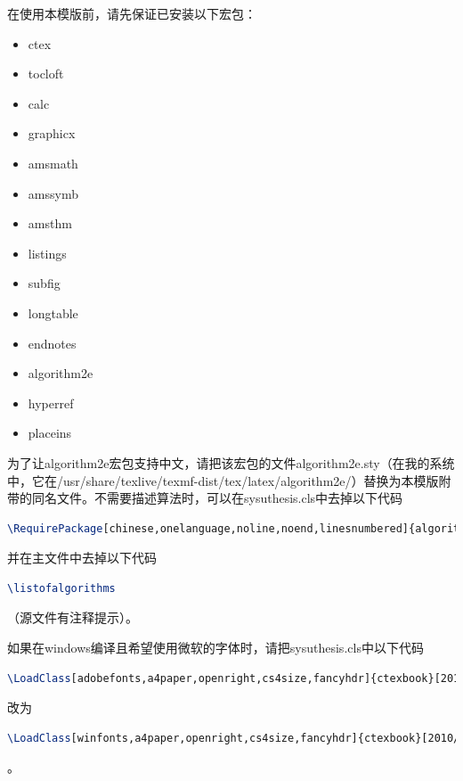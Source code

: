 ﻿\documentclass{sysuthesis}
\begin{document}
在使用本模版前，请先保证已安装以下宏包：

\begin{itemize}
	\item {\ttfamily ctex}
	\item {\ttfamily tocloft}
	\item {\ttfamily calc}
	\item {\ttfamily graphicx}
	\item {\ttfamily amsmath}
	\item {\ttfamily amssymb}
	\item {\ttfamily amsthm}
	\item {\ttfamily listings}
	\item {\ttfamily subfig}
	\item {\ttfamily longtable}
	\item {\ttfamily endnotes}
	\item {\ttfamily algorithm2e}
	\item {\ttfamily hyperref}
	\item {\ttfamily placeins}
\end{itemize}

为了让{\ttfamily algorithm2e}宏包支持中文，请把该宏包的文件{\ttfamily algorithm2e.sty}（在我的系统中，它在{\ttfamily /usr/share/texlive/texmf-dist/tex/latex/algorithm2e/}）替换为本模版附带的同名文件。不需要描述算法时，可以在{\ttfamily sysuthesis.cls}中去掉以下代码
\begin{lstlisting}[language=TeX, keywordstyle=\color{blue}\bfseries, basicstyle=\ttfamily, breaklines=true, frame=shadowbox]
\RequirePackage[chinese,onelanguage,noline,noend,linesnumbered]{algorithm2e}
\end{lstlisting}
并在主文件中去掉以下代码
\begin{lstlisting}[language=TeX, keywordstyle=\color{blue}\bfseries, basicstyle=\ttfamily, breaklines=true, frame=shadowbox]
\listofalgorithms
\end{lstlisting}
（源文件有注释提示）。

如果在windows编译且希望使用微软的字体时，请把{\ttfamily sysuthesis.cls}中以下代码
\begin{lstlisting}[language=TeX, keywordstyle=\color{blue}\bfseries, basicstyle=\ttfamily, breaklines=true, frame=shadowbox]
\LoadClass[adobefonts,a4paper,openright,cs4size,fancyhdr]{ctexbook}[2010/01/22]
\end{lstlisting}
改为
\begin{lstlisting}[language=TeX, keywordstyle=\color{blue}\bfseries, basicstyle=\ttfamily, breaklines=true, frame=shadowbox]
\LoadClass[winfonts,a4paper,openright,cs4size,fancyhdr]{ctexbook}[2010/01/22]
\end{lstlisting}。
\end{document}
